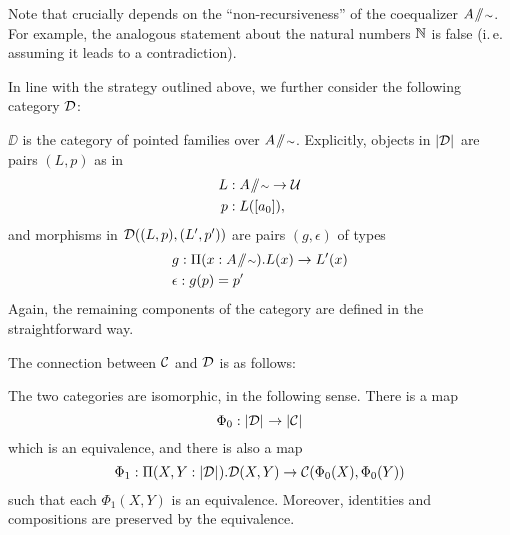 \begin{remark}
Note that  crucially depends on the ``non-recur\-siveness''
of the coequalizer $A \! \sslash \! {\scriptstyle \sim}$.
For example, the analogous statement about the natural numbers $\mathbb{N}$ is false
(i.\,e. assuming it leads to a contradiction).
\end{remark}

In line with the strategy outlined above, we further consider the following
category $\mathcal D$:
\begin{defn}
 $\DD$ is the category of pointed families over $A \! \sslash \! {\scriptstyle \sim}$.
 Explicitly, objects in $\mathopen{}\left|\mathcal D\right|_{}^{}\mathclose{}$ are pairs $(L,p)$ as in
 \begin{align*}
  L &: A \! \sslash \! {\scriptstyle \sim} \to \mathcal{U} \\
  p &: L([a_0]),
 \end{align*}
 and morphisms in $\mathcal D((L,p), (L',p'))$ are pairs $(g,\epsilon)$ of types 
 \begin{align}
  & g : \Pi(x : A \! \sslash \! {\scriptstyle \sim}). L(x) \to L'(x) \label{eq:D0-morph-g}  \\
  & \epsilon : g(p) = p' \label{eq:D0-morph-e}
 \end{align}
 Again, the remaining components of the category are defined in the straightforward way.
\end{defn}

The connection between $\mathcal C$ and $\mathcal D$ is as follows:
\begin{lemma} \label{lem:paths-cats-are-iso}
 The two categories are isomorphic, in the following sense.
 There is a map
 \begin{equation} \label{eq:Phi0-folded}
  \Phi_0 : \mathopen{}\left|\mathcal D\right|_{}^{}\mathclose{} \to \mathopen{}\left|\mathcal C\right|_{}^{}\mathclose{}
 \end{equation}
 which is an equivalence, and there is also a map
 \begin{equation} \label{eq:Phi1-folded}
  \Phi_1 : \Pi (X,Y : \mathopen{}\left|\mathcal D\right|_{}^{}\mathclose{}). \mathcal D(X,Y) \to \mathcal C(\Phi_0(X),\Phi_0(Y))
 \end{equation}
 such that each $\Phi_1(X,Y)$ is an equivalence.
 Moreover, identities and compositions are preserved by the equivalence.
\end{lemma}

